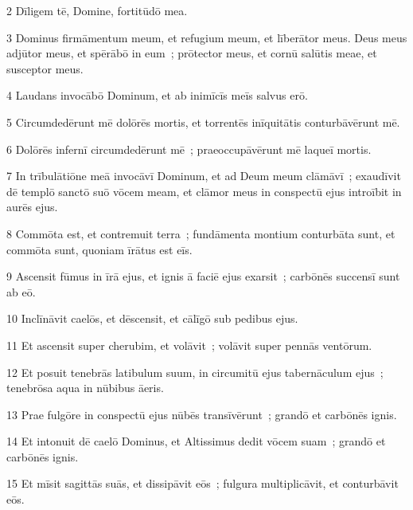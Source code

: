 

\psalmVerse
  {\phantom{00}2}
  {Dīligem tē, Domine, fortitūdō mea.}


\psalmVerse
  {\phantom{00}3}
  {Dominus firmāmentum meum, et refugium meum, et līberātor meus. Deus meus adjūtor meus, et spērābō in eum~; prōtector meus, et cornū salūtis meae, et susceptor meus.}


\psalmVerse
  {\phantom{00}4}
  {Laudans invocābō Dominum, et ab inimīcīs meīs salvus erō.}


\psalmVerse
  {\phantom{00}5}
  {Circumdedērunt mē dolōrēs mortis, et torrentēs inīquitātis conturbāvērunt mē.}


\psalmVerse
  {\phantom{00}6}
  {Dolōrēs infernī circumdedērunt mē~; praeoccupāvērunt mē laqueī mortis.}


\psalmVerse
  {\phantom{00}7}
  {In trībulātiōne meā invocāvī Dominum, et ad Deum meum clāmāvī~; exaudīvit dē templō sanctō suō vōcem meam, et clāmor meus in conspectū ejus introībit in aurēs ejus.}


\psalmVerse
  {\phantom{00}8}
  {Commōta est, et contremuit terra~; fundāmenta montium conturbāta sunt, et commōta sunt, quoniam īrātus est eīs.}


\psalmVerse
  {\phantom{00}9}
  {Ascensit fūmus in īrā ejus, et ignis ā faciē ejus exarsit~; carbōnēs succensī sunt ab eō.}


\psalmVerse
  {\phantom{0}10}
  {Inclīnāvit caelōs, et dēscensit, et cālīgō sub pedibus ejus.}


\psalmVerse
  {\phantom{0}11}
  {Et ascensit super cherubim, et volāvit~; volāvit super pennās ventōrum.}


\psalmVerse
  {\phantom{0}12}
  {Et posuit tenebrās latibulum suum, in circumitū ejus tabernāculum ejus~; tenebrōsa aqua in nūbibus āeris.}


\psalmVerse
  {\phantom{0}13}
  {Prae fulgōre in conspectū ejus nūbēs transīvērunt~; grandō et carbōnēs ignis.}


\psalmVerse
  {\phantom{0}14}
  {Et intonuit dē caelō Dominus, et Altissimus dedit vōcem suam~; grandō et carbōnēs ignis.}


\psalmVerse
  {\phantom{0}15}
  {Et mīsit sagittās suās, et dissipāvit eōs~; fulgura multiplicāvit, et conturbāvit eōs.}


